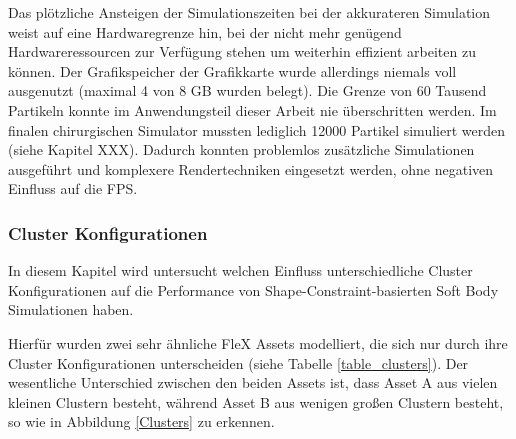 
Das plötzliche Ansteigen der Simulationszeiten bei der akkurateren Simulation weist auf eine Hardwaregrenze hin, bei der nicht mehr genügend Hardwareressourcen zur Verfügung stehen um weiterhin effizient arbeiten zu können. Der Grafikspeicher der Grafikkarte wurde allerdings niemals voll ausgenutzt (maximal 4 von 8 GB wurden belegt). Die Grenze von 60 Tausend Partikeln konnte im Anwendungsteil dieser Arbeit nie überschritten werden. Im finalen chirurgischen Simulator mussten lediglich 12000 Partikel simuliert werden (siehe Kapitel XXX). Dadurch konnten problemlos zusätzliche Simulationen ausgeführt und komplexere Rendertechniken eingesetzt werden, ohne negativen Einfluss auf die FPS.





\clearpage
\subsubsection{Cluster Konfigurationen}




In diesem Kapitel wird untersucht welchen Einfluss unterschiedliche Cluster Konfigurationen auf die Performance von Shape-Constraint-basierten Soft Body Simulationen haben. 

Hierfür wurden zwei sehr ähnliche FleX Assets modelliert, die sich nur durch ihre Cluster Konfigurationen unterscheiden (siehe Tabelle \ref{table_clusters}). Der wesentliche Unterschied zwischen den beiden Assets ist, dass Asset A aus vielen kleinen Clustern besteht, während Asset B aus wenigen großen Clustern besteht, so wie in Abbildung \ref{Clusters} zu erkennen. 

